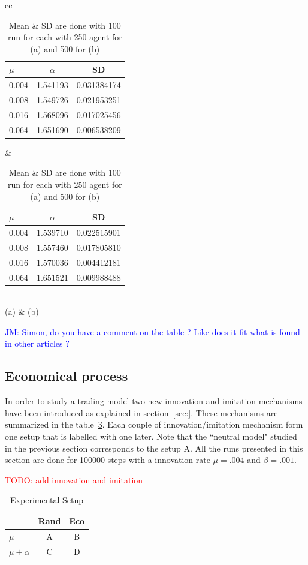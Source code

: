 \documentclass{wscpaperproc}
\newcommand{\memo}[2]{\textcolor{#1}{#2}}
\newcommand{\todo}[1]{\memo{red}{TODO: #1\\}}
\newcommand{\jm}[1]{\memo{blue}{JM: #1\\}}
\begin{document}
\begin{table}[h]
	\centering
	\begin{tabular}{cc}
		\begin{tabular}{l|cc}
			$\mu$ & $\alpha$ & SD\\\hline
			0.004&1.541193&0.031384174\\
			0.008&1.549726&0.021953251\\
			0.016&1.568096&0.017025456\\
			0.064&1.651690&0.006538209\\

		\end{tabular}
		&
		\begin{tabular}{l|cc}
			$\mu$ & $\alpha$ & SD\\\hline
			0.004&1.539710&0.022515901\\
			0.008&1.557460&0.017805810\\
			0.016&1.570036&0.004412181\\
			0.064&1.651521&0.009988488\\
		\end{tabular}\\
		(a) & (b)
	\end{tabular}
	\caption{Mean \& SD are done with 100 run for each with 250 agent for (a) and 500 for (b) }
	\label{tab:mualpha}
\end{table}

\jm{Simon, do you have a comment on the table ? Like does it fit what is found in other articles ?}

\subsection{ Economical  process}

In order to study a trading model two new innovation and imitation mechanisms have been introduced as explained in section~\ref{sec:}. These mechanisms are summarized in the table~\ref{tab:exp}. Each couple of innovation/imitation mechanism form one setup that is labelled with one later. Note that the ``neutral model" studied in the previous section corresponds to the setup A. All the runs presented in this section are done for 100000 steps with a innovation rate $\mu=.004$ and $\beta=.001$.

\todo{add innovation and imitation}
\begin{table}[h]
	\centering
	\begin{tabular}{l|c|c}
		& Rand & Eco \\\hline
		$\mu$ &A & B \\
		$\mu +\alpha$ & C & D \\
	\end{tabular}
	\caption{Experimental Setup}
	\label{tab:exp}
\end{table}
\end{document}
